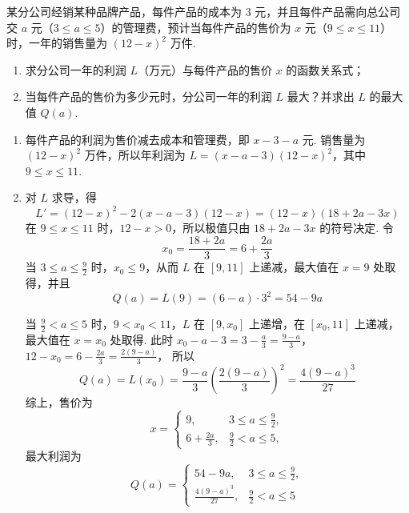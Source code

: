 \begin{problem}
某分公司经销某种品牌产品，每件产品的成本为 \(3\text{ 元}\)，并且每件产品需向总公司交 \(a\text{ 元}\)（\(3 \leqslant a \leqslant 5\)）的管理费，预计当每件产品的售价为 \(x\text{ 元}\)（\(9 \leqslant x \leqslant 11\)）时，一年的销售量为 \((12 - x)^{2}\text{ 万件}\).

\begin{enumerate}
\item 求分公司一年的利润 \(L\)（万元）与每件产品的售价 \(x\) 的函数关系式；
\item 当每件产品的售价为多少元时，分公司一年的利润 \(L\) 最大？并求出 \(L\) 的最大值 \(Q(a)\).
\end{enumerate}
\end{problem}

\begin{solution}
\begin{enumerate}
\item 每件产品的利润为售价减去成本和管理费，即 \(x-3-a\) 元. 销售量为 \((12-x)^{2}\) 万件，所以年利润为 \(L=(x-a-3)(12-x)^{2}\)，其中 \(9\leqslant x\leqslant 11\).

\item 对 \(L\) 求导，得
\[
L'=(12-x)^{2}-2(x-a-3)(12-x)=(12-x)(18+2a-3x)
\]
在 \(9\leqslant x\leqslant 11\) 时，\(12-x>0\)，所以极值只由 \(18+2a-3x\) 的符号决定. 令
\[
x_{0}=\frac{18+2a}{3}=6+\frac{2a}{3}
\]
当 \(3\leqslant a\leqslant\frac{9}{2}\) 时，\(x_{0}\leqslant 9\)，从而 \(L\) 在 \([9,11]\) 上递减，最大值在 \(x=9\) 处取得，并且
\[
Q(a)=L(9)=(6-a)\cdot 3^{2}=54-9a
\]

当 \(\frac{9}{2}<a\leqslant 5\) 时，\(9<x_{0}<11\)，\(L\) 在 \([9,x_{0}]\) 上递增，在 \([x_{0},11]\) 上递减，最大值在 \(x=x_{0}\) 处取得. 此时 \(x_{0}-a-3=3-\frac{a}{3}=\frac{9-a}{3}\)，\(12-x_{0}=6-\frac{2a}{3}=\frac{2(9-a)}{3}\)，
所以
\[
Q(a)=L(x_{0})=\frac{9-a}{3}\left(\frac{2(9-a)}{3}\right)^{2}
=\frac{4(9-a)^{3}}{27}
\]
综上，售价为
\[
x=\begin{cases}
9,&3\leqslant a\leqslant\frac{9}{2},\\
6+\frac{2a}{3},&\frac{9}{2}<a\leqslant5,
\end{cases}
\]
最大利润为
\[
Q(a)=\begin{cases}
54-9a,&3\leqslant a\leqslant\frac{9}{2},\\
\frac{4(9-a)^{3}}{27},&\frac{9}{2}<a\leqslant5
\end{cases}
\]
\end{enumerate}
\end{solution}

